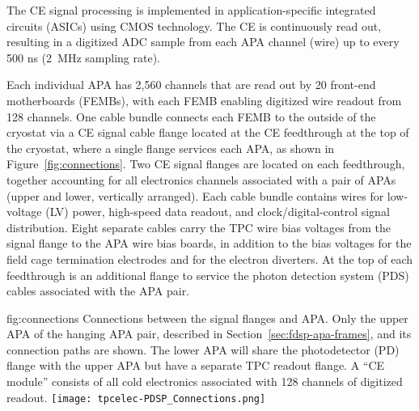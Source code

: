 The CE signal processing is implemented in application-specific integrated circuits (ASICs)
using CMOS technology.  The CE is continuously read out, resulting in a digitized ADC
sample from each APA channel (wire) up to every 500 ns (2~MHz sampling rate).

Each individual APA has 2,560 channels that are read out by 20 front-end motherboards (FEMBs), with
each FEMB enabling digitized wire readout from 128 channels.  One cable bundle connects each FEMB to
the outside of the cryostat via a CE signal cable flange located at the CE feedthrough at the
top of the cryostat, where a single flange services each APA, as shown in Figure~\ref{fig:connections}.  Two CE signal flanges are located on each feedthrough, together accounting for all electronics channels associated with a pair of APAs (upper and lower, vertically arranged).
Each cable bundle contains wires for low-voltage (LV) power, high-speed data readout, and
clock/digital-control signal distribution.  Eight separate cables carry the TPC wire bias voltages
from the signal flange to the APA wire bias boards, in addition to the bias voltages for the field
cage termination electrodes and for the electron diverters.  At the top of each feedthrough is an additional flange to service the photon detection system (PDS) cables associated with the APA pair.

\begin{dunefigure}
{fig:connections}
{Connections between the signal flanges and APA. Only the upper APA of the hanging APA pair, described in Section~\ref{sec:fdsp-apa-frames}, and its connection paths are shown. The lower APA will share the photodetector (PD) flange with the upper APA but have a separate TPC readout flange. A ``CE module'' consists of all cold electronics associated with 128 channels of digitized readout.}
\hspace{1cm}
\texttt{[image: tpcelec-PDSP\_Connections.png]}
\end{dunefigure}


